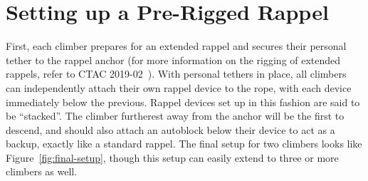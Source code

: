\documentclass[nonacm,acmtog]{acmart}
\begin{document}
\section{Setting up a Pre-Rigged Rappel}
\label{sec:setup}

  First, each climber prepares for an extended rappel and secures their
  personal tether to the rappel anchor (for more information on the rigging of
  extended rappels, refer to CTAC 2019-02~\cite{ctac:2019-2}).  With personal
  tethers in place, all climbers can independently attach their own rappel
  device to the rope, with each device immediately below the previous.  Rappel
  devices set up in this fashion are said to be ``stacked''. The climber
  furtherest away from the anchor will be the first to descend, and should
  also attach an autoblock below their device to act as a backup, exactly like
  a standard rappel.  The final setup for two climbers looks like
  Figure~\ref{fig:final-setup}, though this setup can easily extend to three or
  more climbers as well.
\end{document}
